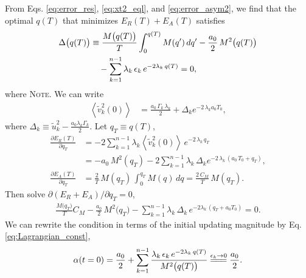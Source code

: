 \documentclass[reprint, superscriptaddress, floatfix]{revtex4-1}
\newcommand{\note}[1]{{\color{DarkGreen}\footnotesize \textsc{Note.} #1}}
\newcommand{\Err}{E}
\begin{document}
%
From Eqs. \eqref{eq:error_res},
\eqref{eq:xt2_eql},
and \eqref{eq:error_asym2},
we find that
the optimal $q(T)$ that minimizes $\Err_R(T) + \Err_A(T)$
satisfies
%
\begin{align}
  \Delta\bigl( q(T) \bigr)
  &\equiv
  \frac{ M\bigl( q(T) \bigr) } { T }
    \int_0^{q(T)} M(q') \, d q'
  -\frac{a_0}{2} \, M^2\bigl( q(T) \bigr)
  \notag \\
  &\quad
  -\sum_{k = 1}^{n-1}
  \lambda_k \, \epsilon_k \, e^{-2\lambda_k \, q(T)}
  =0
  ,
\label{eq:opt_qT}
\end{align}
where
%
%
\note{We can write
\begin{align*}
  \left\langle
    {\tilde v}_k^2(0)
  \right\rangle
  &=
  \frac { a_0 \, \Gamma_k \, \lambda_k } { 2 }
  +
  \Delta_k
  e^{-2\, \lambda_k a_0 T_0}
  ,
\end{align*}
%
where $\Delta_k \equiv \tilde u_k^2 - \frac{a_0 \lambda_k \Gamma_k}{2}$.
%
Let $q_T \equiv q(T)$,
\begin{align*}
  \frac{
    \partial \Err_R(T)
  }
  {
    \partial q_T
  }
  &=
  -2\sum_{k=1}^{n-1} \lambda_k
  \left\langle
    \tilde v_k^2(0)
  \right\rangle \,
  e^{-2 \, \lambda_k \, q_T}
  \\
  &=
  -a_0 \, M^2(q_T)
  -2
  \sum_{k=1}^{n-1} \lambda_k \,
  \Delta_k e^{-2 \, \lambda_k \, (a_0 \, T_0 + q_T)}
  ,
  \\
  \frac{
    \partial \Err_A(T)
  }
  {
    \partial q_T
  }
  &=
  \frac 2 T \,
  M(q_T) \,
  \int_0^{ q_T } M(q) \, dq
  =
  \frac{ 2 \, C_M } { T } \, M(q_T)
  .
\end{align*}
Then solve $\partial (\Err_R + \Err_A) / \partial q_T = 0$,
\begin{align*}
  \frac{ M\bigl( q_T \bigr) } { T } C_M
  -\frac{a_0}{2} \, M^2\bigl( q_T \bigr)
  -\sum_{k = 1}^{n-1}
  \lambda_k \, \Delta_k \, e^{-2\lambda_k \, (q_T + a_0 T_0)}
  =0
  .
\end{align*}
}
%
We can rewrite the condition in terms of
the initial updating magnitude
by Eq. \eqref{eq:Lagrangian_const}, %
\begin{align}
  \alpha(t = 0)
  =
  \frac{ a_0 } { 2 }
  +
  \sum_{k = 1}^{n-1}
  \frac{
    \lambda_k \, \epsilon_k \, e^{-2\lambda_k \, q(T)}
  }{M^2\bigl( q(T) \bigr)}
  \stackrel{\epsilon_k \to 0}{=\joinrel=\joinrel=}
  \frac{ a_0 }
       { 2 }
  .
  \label{eq:half_alpha0}
\end{align}
\end{document}
